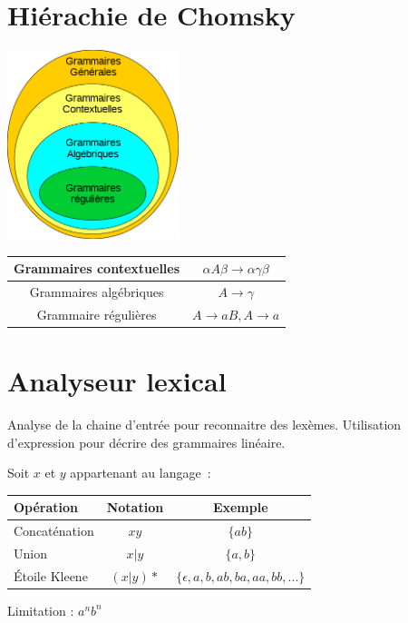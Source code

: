 \documentclass{beamer}
\begin{document}
\section{Hiérachie de Chomsky}

\begin{frame}
	\begin{center}
		\includegraphics[width=5cm]{Images/chomsky.png} \\
		\begin{tabular}{|c|c|}
			\hline
				Grammaires contextuelles & $\alpha A \beta \rightarrow \alpha \gamma \beta $ \\
			\hline
				Grammaires algébriques & $A \rightarrow \gamma $ \\
			\hline
				Grammaire régulières & $ A \rightarrow a B, A \rightarrow a $ \\
			\hline
		\end{tabular}
	\end{center}
\end{frame}

\section{Analyseur lexical}

\begin{frame}
 Analyse de la chaine d'entrée pour reconnaitre des lexèmes.
 Utilisation d'expression pour décrire des grammaires linéaire.

 Soit $x$ et $y$ appartenant au langage~: \\
 \begin{center}
	\begin{tabular}{|l|c|c|}
		\hline
		Opération & Notation & Exemple \\
		\hline
		Concaténation & $xy$ & $\{ab\}$ \\
		\hline
		Union & $x|y$ & $\{a, b\}$ \\
		\hline
		Étoile Kleene & $(x|y)*$ & $\{\epsilon, a, b, ab, ba, aa, bb, ...\}$ \\
		\hline
	\end{tabular}
 \end{center}

 Limitation : $a^nb^n$
\end{frame}
\end{document}
